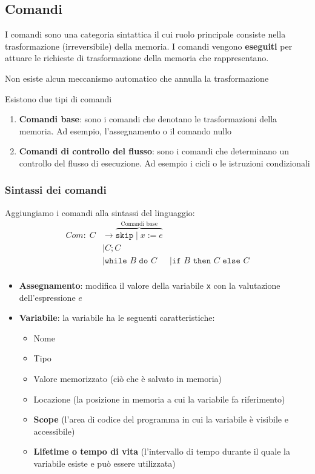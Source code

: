 \documentclass[a4paper]{article}
\begin{document}
\subsection{Comandi}
I comandi sono una categoria sintattica il cui ruolo principale consiste nella
trasformazione (irreversibile) della memoria. I comandi vengono \textbf{eseguiti} per attuare
le richieste di trasformazione della memoria che rappresentano.

{
Non esiste alcun meccanismo automatico che annulla la trasformazione
}

\noindent
Esistono due tipi di comandi
\begin{enumerate}
\item \textbf{Comandi base}: sono i comandi che denotano le trasformazioni della
  memoria. Ad esempio, l'assegnamento o il comando nullo

\item \textbf{Comandi di controllo del flusso}:
  sono i comandi che determinano un controllo del flusso di esecuzione.
  Ad esempio i cicli o le istruzioni condizionali
\end{enumerate}

\subsubsection{Sintassi dei comandi}
Aggiungiamo i comandi alla sintassi del linguaggio:
\[
\begin{aligned}
  Com: \; C & \to \overbrace{
    \texttt{skip} \mid x := e 
  }^{\text{Comandi base}} \\
                    & \mid C; C  \\
                    & \mid \texttt{while } B \texttt{ do } C
                    & \mid \texttt{if } B \texttt{ then } C \texttt{ else } C  \\
\end{aligned}
\] 
\begin{itemize}
\item \textbf{Assegnamento}: modifica il valore della variabile \texttt{x} con la
  valutazione dell'espressione \( e \)

\item \textbf{Variabile}: la variabile ha le seguenti caratteristiche:
  \begin{itemize}
    \item Nome
    \item Tipo
    \item Valore memorizzato (ciò che è salvato in memoria)
    \item Locazione (la posizione in memoria a cui la variabile fa riferimento)
    \item \textbf{Scope} (l'area di codice del programma in cui la variabile è
      visibile e accessibile)
    \item \textbf{Lifetime o tempo di vita} (l'intervallo di tempo durante
      il quale la variabile esiste e può essere utilizzata)
  \end{itemize}
\end{itemize}
\end{document}
